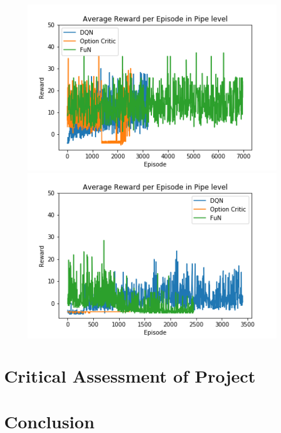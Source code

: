 \documentclass[notitlepage,a4paper,11pt]{article}
\begin{document}
\begin{figure}[!htb]
  \includegraphics[width=\linewidth]{figs/all_results_1.png}
\endminipage\hfill
{}
  \includegraphics[width=\linewidth]{figs/all_results_2.png}
\endminipage\hfill
\end{figure}



\section{Critical Assessment of Project}

\section{Conclusion}

\pagebreak
\end{document}
